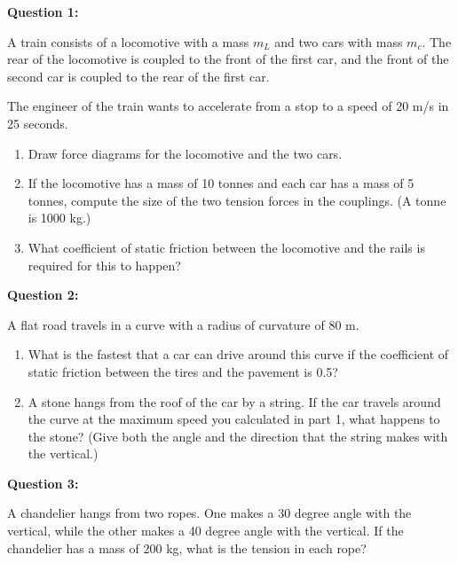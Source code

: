 \documentclass[12pt]{article}
\begin{document}
\bigskip
\bigskip
\bigskip
\bigskip

\Large \centerline{}
\normalsize

{\bf Question 1:}

A train consists of a locomotive with a mass $m_L$ and two cars with mass $m_c$. The rear of the locomotive is coupled to the front of the first car, and the front of the second car is coupled to the rear of the first car.

The engineer of the train wants to accelerate from a stop to a speed of 20 m/s in 25 seconds.

\begin{enumerate}
  \item{Draw force diagrams for the locomotive and the two cars.}
  \item{If the locomotive has a mass of 10 tonnes and each car has a mass of 5 tonnes, compute the size of the two tension forces in the couplings. (A tonne is 1000 kg.)}
  \item{What coefficient of static friction between the locomotive and the rails is required for this to happen?}
\end{enumerate}

\bigskip
\bigskip
\bigskip
\bigskip


{\bf Question 2:}

A flat road travels in a curve with a radius of curvature of 80 m.

\begin{enumerate}
  \item{What is the fastest that a car can drive around this curve if the coefficient of static friction between the tires and the pavement is 0.5?}
  \item{A stone hangs from the roof of the car by a string. If the car travels around the curve at the maximum speed you calculated in part 1, what happens to the stone? (Give both the angle and the direction that the
    string makes with the vertical.)}
\end{enumerate}

\bigskip
\bigskip
\bigskip
\bigskip


{\bf Question 3:}

A chandelier hangs from two ropes. One makes a 30 degree angle with the vertical, while the other makes a 40 degree angle with the vertical. If the chandelier has a mass of 200 kg, what is the tension in each rope?


\bigskip
\bigskip
\bigskip
\bigskip
\end{document}
